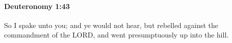 
		\paragraph{Deuteronomy 1:43} %
			\label{DEUTERONOMY-1-43}

			So I spake unto you; and ye would not hear, but rebelled against the commandment of the LORD, and went presumptuously up into the hill.


